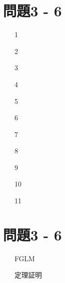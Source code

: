 \documentclass[12pt,a4paper]{jsarticle}
\begin{document}
\section*{問題3 - 6}
\begin{enumerate}
 \item[1]  \mbox{} \\
 \item[2]  \mbox{} \\
 \item[3]  \mbox{} \\
 \item[4]  \mbox{} \\
 \item[5]  \mbox{} \\
 \item[6]  \mbox{} \\
 \item[7]  \mbox{} \\
 \item[8]  \mbox{} \\
 \item[9]  \mbox{} \\
 \item[10]  \mbox{} \\
 \item[11]  \mbox{} \\
\end{enumerate}
\pagebreak

\section*{問題3 - 6}
\begin{enumerate}
 \item[FGLM]  \mbox{} \\
 \item[定理証明]  \mbox{} \\
\end{enumerate}
\end{document}
